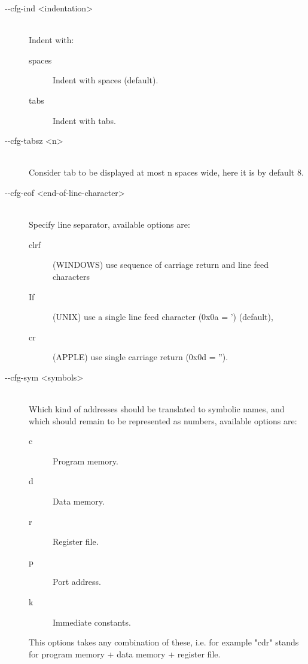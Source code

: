 \begin{description}
            \item[-{}-cfg-ind <indentation>]~\\
                Indent with:
                \begin{description}
                    \item [spaces] Indent with spaces (default).
                    \item [tabs] Indent with tabs.
                \end{description}

            \item[-{}-cfg-tabsz <n>]~\\
                Consider tab to be displayed at most n spaces wide, here it is by default 8.

            \item[-{}-cfg-eof <end-of-line-character>]~\\
                Specify line separator, available options are:
                \begin{description}
                    \item [clrf] (WINDOWS) use sequence of carriage return and line feed characters
                    \item [If] (UNIX) use a single line feed character (0x0a = ') (default),
                    \item [cr] (APPLE) use single carriage return (0x0d = '').
                \end{description}

            \item[-{}-cfg-sym <symbols>]~\\
                Which kind of addresses should be translated to symbolic names, and which should remain to be represented as numbers, available options are:
                \begin{description}
                    \item [c] Program memory.
                    \item [d] Data memory.
                    \item [r] Register file.
                    \item [p] Port address.
                    \item [k] Immediate constants.
                \end{description}
                This options takes any combination of these, i.e. for example "cdr" stands for program memory + data memory + register file.


\end{description}
